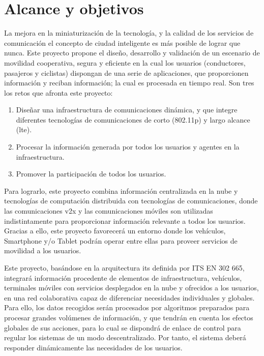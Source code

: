 \chapter{Alcance y objetivos}\label{cha:alcance}
La mejora en la miniaturización de la tecnología, y la calidad de los servicios
de comunicación el concepto de ciudad inteligente es más posible de lograr que
nunca. Este proyecto propone el diseño, desarrollo y validación de un escenario
de movilidad cooperativa, segura y eficiente en la cual los usuarios
(conductores, pasajeros y ciclistas) dispongan de una serie de aplicaciones, que
proporcionen información y reciban información; la cual es procesada en tiempo
real. Son tres los retos que afronta este proyecto:

\begin{enumerate}
	\item Diseñar una infraestructura de comunicaciones dinámica, y que integre
	diferentes tecnologías de comunicaciones de corto (\Gls{802.11p}) y largo
	alcance (\gls{lte}).

	\item Procesar la información generada por todos los usuarios y agentes en la
	infraestructura.

	\item Promover la participación de todos los usuarios.

\end{enumerate}
Para lograrlo, este proyecto combina información centralizada en la nube y
tecnologías de computación distribuida con tecnologías de comunicaciones, donde
las comunicaciones \gls{v2x} y las comunicaciones móviles son utilizadas
indistintamente para proporcionar información relevante a todos los usuarios.
Gracias a ello, este proyecto favorecerá un entorno donde los vehículos,
Smartphone y/o Tablet podrán operar entre ellas para proveer servicios de
movilidad a los usuarios.

Este proyecto, basándose en la arquitectura \gls{its} definida por ITS EN 302
665, integrará información procedente de elementos de infraestructura,
vehículos, terminales móviles con servicios desplegados en la nube y ofrecidos
a los usuarios, en una red colaborativa capaz de diferenciar necesidades
individuales y globales. Para ello, los datos recogidos serán procesados por
algoritmos preparados para procesar grandes volúmenes de información, y que
tendrán en cuenta los efectos globales de sus acciones, para lo cual se
dispondrá de enlace de control para regular los sistemas de un modo
descentralizado. Por tanto, el sistema deberá responder dinámicamente las
necesidades de los usuarios.


